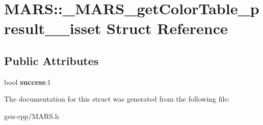 \hypertarget{structMARS_1_1__MARS__getColorTable__presult____isset}{}\section{M\+A\+RS\+:\+:\+\_\+\+M\+A\+R\+S\+\_\+get\+Color\+Table\+\_\+presult\+\_\+\+\_\+isset Struct Reference}
\label{structMARS_1_1__MARS__getColorTable__presult____isset}
\subsection*{Public Attributes}
\begin{DoxyCompactItemize}
\item 
\mbox{\label{structMARS_1_1__MARS__getColorTable__presult____isset_a32996cc48d86b624cdfa4cd0b69de6b2}} 
bool {\bfseries success}\+:1
\end{DoxyCompactItemize}


The documentation for this struct was generated from the following file\+:\begin{DoxyCompactItemize}
\item 
gen-\/cpp/M\+A\+R\+S.\+h\end{DoxyCompactItemize}
